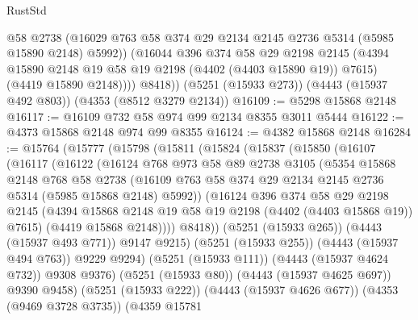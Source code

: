 \begin{lexlean}{RustStd}
\begin{coremodule}
              @58
              @2738
              (@16029 @763 @58 @374 @29 @2134 @2145 @2736 @5314 (@5985 @15890 @2148) @5992))
            (@16044
              @396
              @374
              @58
              @29
              @2198
              @2145
              (@4394 @15890 @2148 @19 @58 @19 @2198 (@4402 (@4403 @15890 @19)) @7615)
              (@4419 @15890 @2148))))
        @8418))
    (@5251 (@15933 @273))
    (@4443 (@15937 @492 @803))
    (@4353 (@8512 @3279 @2134))
@16109 := @5298 @15868 @2148
@16117 := @16109 @732 @58 @974 @99 @2134 @8355 @3011 @5444
@16122 := @4373 @15868 @2148 @974 @99 @8355
@16124 := @4382 @15868 @2148
@16284 := @15764
    (@15777
      (@15798
        (@15811
          (@15824
            (@15837
              (@15850
                (@16107
                  (@16117
                    (@16122
                      (@16124
                        @768
                        @973
                        @58
                        @89
                        @2738
                        @3105
                        (@5354
                          @15868
                          @2148
                          @768
                          @58
                          @2738
                          (@16109
                            @763
                            @58
                            @374
                            @29
                            @2134
                            @2145
                            @2736
                            @5314
                            (@5985 @15868 @2148)
                            @5992))
                        (@16124
                          @396
                          @374
                          @58
                          @29
                          @2198
                          @2145
                          (@4394 @15868 @2148 @19 @58 @19 @2198 (@4402 (@4403 @15868 @19)) @7615)
                          (@4419 @15868 @2148))))
                    @8418))
                (@5251 (@15933 @265))
                (@4443 (@15937 @493 @771))
                @9147
                @9215)
              (@5251 (@15933 @255))
              (@4443 (@15937 @494 @763))
              @9229
              @9294)
            (@5251 (@15933 @111))
            (@4443 (@15937 @4624 @732))
            @9308
            @9376)
          (@5251 (@15933 @80))
          (@4443 (@15937 @4625 @697))
          @9390
          @9458)
        (@5251 (@15933 @222))
        (@4443 (@15937 @4626 @677))
        (@4353 (@9469 @3728 @3735))
        (@4359
          @15781

\end{coremodule}
\end{lexlean}
